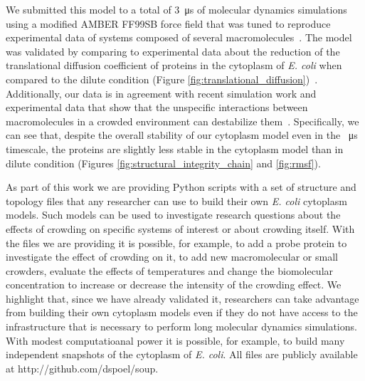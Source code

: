 \documentclass[journal=jcisd8,manuscript=article]{achemso}
\begin{document}
We submitted this model to a total of \SI{3}{\micro\second} of
molecular dynamics simulations using a modified AMBER FF99SB force
field that was tuned to reproduce experimental data of systems
composed of several macromolecules~\cite{Best2014a}. The model was
validated by comparing to experimental data about the reduction of the
translational diffusion coefficient of proteins in the cytoplasm of
\textit{E. coli} when compared to the dilute condition (Figure
\ref{fig:translational_diffusion})~\cite{Elowitz1999,Konopka2006}. Additionally,
our data is in agreement with recent simulation work and experimental data
that show that the unspecific interactions between macromolecules in a
crowded environment can destabilize
them~\cite{Feig2011,miklos2011,Wang2012b}. Specifically, we can see
that, despite the overall stability of our cytoplasm model even in the
\SI{}{\micro\second} timescale, the proteins are slightly less stable
in the cytoplasm model than in dilute condition (Figures
\ref{fig:structural_integrity_chain} and \ref{fig:rmsf}).



As part of this work we are providing Python scripts with a set of
structure and topology files that any researcher can use to build
their own \textit{E. coli} cytoplasm models. Such models can be used
to investigate research questions about the effects of
crowding on specific systems of interest or about crowding
itself. With the files we are providing it is possible, for example,
to add a probe protein to investigate the effect of crowding on it, to
add new macromolecular or small crowders, evaluate the effects of
 temperatures and change the biomolecular concentration to
increase or decrease the intensity of the crowding effect. We
highlight that, since we have already validated it, researchers can
take advantage from building their own cytoplasm models even if they
do not have access to the infrastructure that is necessary to perform
long molecular dynamics simulations. With modest computatioanal power
it is possible, for example, to build many independent snapshots of
the cytoplasm of \textit{E. coli}. All files are publicly available at
http://github.com/dspoel/soup.

 


 
\end{document}
